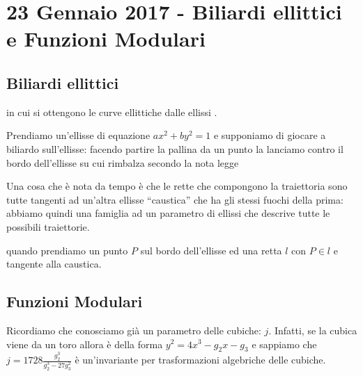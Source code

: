 \chapter{23 Gennaio 2017 - Biliardi ellittici e Funzioni Modulari}
\justify

\section{Biliardi ellittici}
 in cui si ottengono le curve
ellittiche dalle ellissi .

Prendiamo un'ellisse di equazione $ax^2 + by^2 = 1$ e supponiamo di
giocare a biliardo sull'ellisse: facendo partire la pallina da un punto
la lanciamo contro il bordo dell'ellisse su cui rimbalza secondo la nota
legge 


Una cosa che è nota da tempo è che le rette che compongono la
traiettoria sono tutte tangenti ad un'altra ellisse ``caustica'' che ha
gli stessi fuochi della prima: abbiamo quindi una famiglia ad un
parametro di ellissi che descrive tutte le possibili traiettorie.

 quando prendiamo un punto $P$
sul bordo dell'ellisse ed una retta $l$ con $P \in l$ e tangente alla
caustica.

\section{Funzioni Modulari}


\begin{osservazione}
  Ricordiamo che conosciamo già un parametro delle cubiche:
  $j$. Infatti, se la cubica viene da un toro allora è della forma
  $y^2 = 4 x^3 - g_2 x - g_3$ e sappiamo che
  $j = 1728 \frac{g_2^3}{g_2^3 - 27 g_3^2}$ è un'invariante per
  trasformazioni algebriche delle cubiche.
\end{osservazione}

